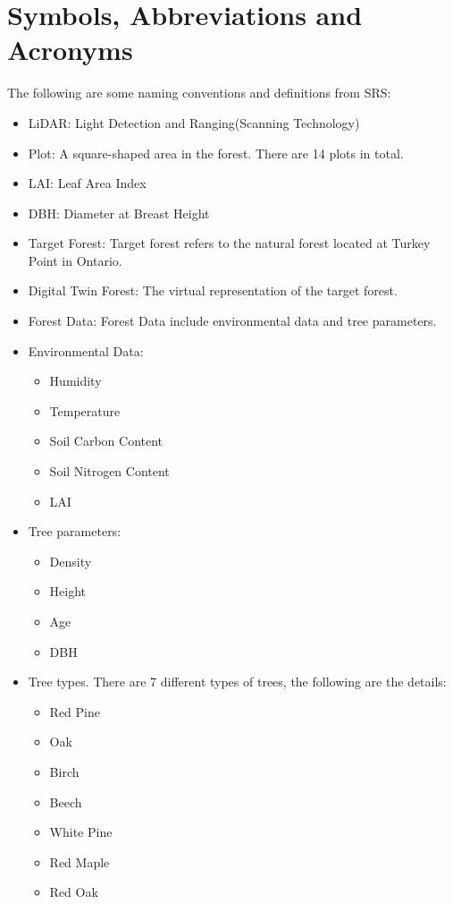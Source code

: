 \documentclass[12pt, titlepage]{article}
\begin{document}
\section{Symbols, Abbreviations and Acronyms}
The following are some naming conventions and definitions from SRS:
\begin{itemize}
\item LiDAR: Light Detection and Ranging(Scanning Technology)
\item Plot: A square-shaped area in the forest. There are 14 plots in total. 
\item LAI: Leaf Area Index
\item DBH: Diameter at Breast Height
\item Target Forest: Target forest refers to the natural forest located at Turkey
Point in Ontario.
\item Digital Twin Forest: The virtual representation of the target forest.
\item Forest Data: Forest Data include environmental data and tree parameters.
\item Environmental Data:
\begin{itemize}
    \item Humidity
    \item Temperature
    \item Soil Carbon Content
    \item Soil Nitrogen Content
    \item LAI 
\end{itemize}
\item Tree parameters: 
\begin{itemize}
    \item Density
    \item Height
    \item Age
    \item DBH 
\end{itemize}
\item Tree types. There are 7 different types of trees,
the following are the details:
\begin{itemize}
    \item Red Pine
    \item Oak
    \item Birch 
    \item Beech
    \item White Pine
    \item Red Maple
    \item Red Oak
\end{itemize}
\end{itemize}
\end{document}
